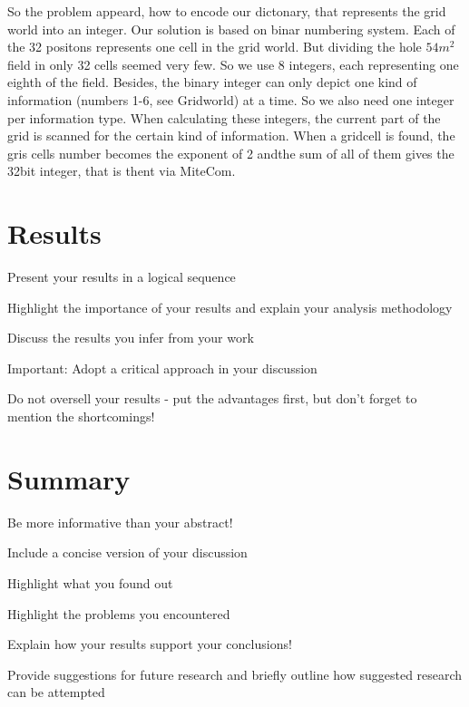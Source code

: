 \documentclass[lnicst,a4paper]{svmultln}
\begin{document}
So the problem appeard, how to encode our dictonary, that represents the grid world into an integer.
Our solution is based on binar numbering system. Each of the 32 positons represents one cell in the grid world. But dividing the hole $54m^2$ field in only 32 cells seemed very few. So we use 8 integers, each representing one eighth of the field.
Besides, the binary integer can only depict one kind of information (numbers 1-6, see Gridworld) at a time. So we also need one integer per information type.
When calculating these integers, the current part of the grid is scanned for the certain kind of information. When a gridcell is found, the gris cells number becomes the exponent of 2 andthe sum of all of them gives the 32bit integer, that is thent via MiteCom.


\section{Results}

Present your results in a logical sequence

Highlight the importance of your results and explain your
analysis methodology

Discuss the results you infer from your work

Important:
Adopt a critical approach in your discussion

Do not oversell your results - put the advantages first, but
don’t forget to mention the shortcomings!





\section{Summary}

Be more informative than your abstract!

Include a concise version of your discussion

Highlight what you found out

Highlight the problems you encountered

Explain how your results support your conclusions!

Provide suggestions for future research and briefly outline how
suggested research can be attempted
\end{document}
